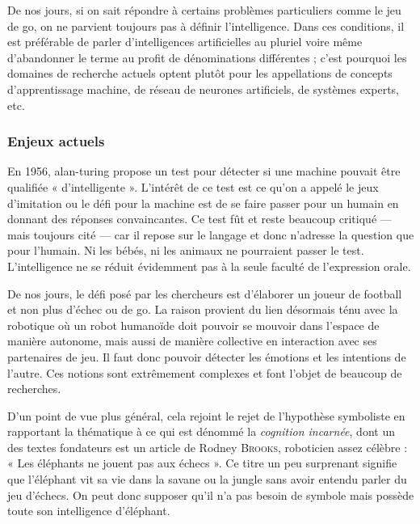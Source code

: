 
De nos jours, si on sait répondre à certains problèmes particuliers comme le jeu de go, on ne parvient toujours pas à définir l'intelligence. Dans ces conditions, il est préférable de parler d'intelligences artificielles au pluriel voire même d'abandonner le terme au profit de dénominations différentes ; c'est pourquoi les domaines de recherche actuels optent plutôt pour les appellations de concepts d'apprentissage machine, de réseau de neurones artificiels, de systèmes experts, etc.

\vspace{\baselineskip}%

\subsubsection[Enjeux actuels]{Enjeux actuels}
\label{subsub:III.1.1.3}

En 1956, \gls{alan-turing} propose un test pour détecter si une machine pouvait être qualifiée « d’intelligente ». L'intérêt de ce test est ce qu'on a appelé le jeux d'imitation ou le défi pour la machine est de se faire passer pour un humain en donnant des réponses convaincantes. Ce test fût et reste beaucoup critiqué --- mais toujours cité --- car il repose sur le langage et donc n'adresse la question que pour l'humain. Ni les bébés, ni les animaux ne pourraient passer le test. L'intelligence ne se réduit évidemment pas à la seule faculté de l'expression orale.

De nos jours, le défi posé par les chercheurs est d'élaborer un joueur de football et non plus d'échec ou de go. La raison provient du lien désormais ténu avec la robotique où un robot humanoïde doit pouvoir se mouvoir dans l'espace de manière autonome, mais aussi de manière collective en interaction avec ses partenaires de jeu. Il faut donc pouvoir détecter les émotions et les intentions de l'autre. Ces notions sont extrêmement complexes et font l'objet de beaucoup de recherches. 

D'un point de vue plus général, cela rejoint le rejet de l'hypothèse symboliste en rapportant la thématique à ce qui est dénommé la \emph{cognition incarnée}, dont un des textes fondateurs est un article de Rodney \textsc{Brooks}, roboticien assez célèbre : « Les éléphants ne jouent pas aux échecs ». Ce titre un peu surprenant signifie que l'éléphant vit sa vie dans la savane ou la jungle sans avoir entendu parler du jeu d'échecs. On peut donc supposer qu'il n'a pas besoin de symbole mais possède toute son intelligence d'éléphant.

